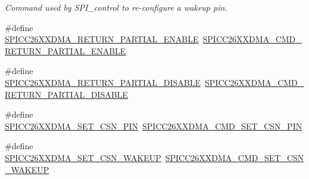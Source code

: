 \begin{DoxyCompactItemize}
\begin{DoxyCompactList}\small\item\em Command used by S\+P\+I\+\_\+control to re-\/configure a wakeup pin. \end{DoxyCompactList}\item 
\#define \hyperlink{_s_p_i_c_c26_x_x_d_m_a_8h_a5d2c909f70c7093227d1b288354cef27}{S\+P\+I\+C\+C26\+X\+X\+D\+M\+A\+\_\+\+R\+E\+T\+U\+R\+N\+\_\+\+P\+A\+R\+T\+I\+A\+L\+\_\+\+E\+N\+A\+B\+L\+E}~\hyperlink{group___s_p_i___c_m_d_ga348d271d5ad295c5e049e78d745c57e1}{S\+P\+I\+C\+C26\+X\+X\+D\+M\+A\+\_\+\+C\+M\+D\+\_\+\+R\+E\+T\+U\+R\+N\+\_\+\+P\+A\+R\+T\+I\+A\+L\+\_\+\+E\+N\+A\+B\+L\+E}
\item 
\#define \hyperlink{_s_p_i_c_c26_x_x_d_m_a_8h_a6454ac0d2222d98114cf15a4a60367ca}{S\+P\+I\+C\+C26\+X\+X\+D\+M\+A\+\_\+\+R\+E\+T\+U\+R\+N\+\_\+\+P\+A\+R\+T\+I\+A\+L\+\_\+\+D\+I\+S\+A\+B\+L\+E}~\hyperlink{group___s_p_i___c_m_d_gaff8de4036abcdb2903cb5280120c30b4}{S\+P\+I\+C\+C26\+X\+X\+D\+M\+A\+\_\+\+C\+M\+D\+\_\+\+R\+E\+T\+U\+R\+N\+\_\+\+P\+A\+R\+T\+I\+A\+L\+\_\+\+D\+I\+S\+A\+B\+L\+E}
\item 
\#define \hyperlink{_s_p_i_c_c26_x_x_d_m_a_8h_a447172f0061a6de65a8f0d221a23f93c}{S\+P\+I\+C\+C26\+X\+X\+D\+M\+A\+\_\+\+S\+E\+T\+\_\+\+C\+S\+N\+\_\+\+P\+I\+N}~\hyperlink{group___s_p_i___c_m_d_gab3ab03abd9ca073344acdcc6b442f9eb}{S\+P\+I\+C\+C26\+X\+X\+D\+M\+A\+\_\+\+C\+M\+D\+\_\+\+S\+E\+T\+\_\+\+C\+S\+N\+\_\+\+P\+I\+N}
\item 
\#define \hyperlink{_s_p_i_c_c26_x_x_d_m_a_8h_a55b298e59379bdd6020f8d55bb4264a9}{S\+P\+I\+C\+C26\+X\+X\+D\+M\+A\+\_\+\+S\+E\+T\+\_\+\+C\+S\+N\+\_\+\+W\+A\+K\+E\+U\+P}~\hyperlink{group___s_p_i___c_m_d_gae07fd93964e63fc93795835eaa14b589}{S\+P\+I\+C\+C26\+X\+X\+D\+M\+A\+\_\+\+C\+M\+D\+\_\+\+S\+E\+T\+\_\+\+C\+S\+N\+\_\+\+W\+A\+K\+E\+U\+P}
\end{DoxyCompactItemize}

